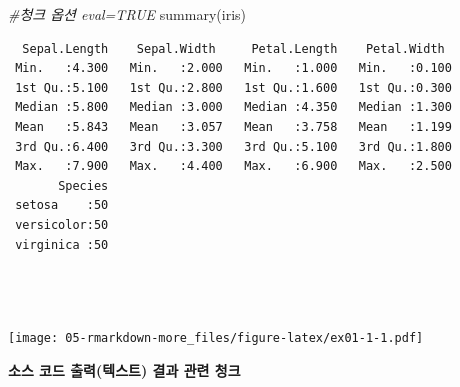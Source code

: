 \documentclass[
  11pt,
]{krantz}
\newenvironment{Shaded}{\begin{snugshade}}{\end{snugshade}}
\newcommand{\CommentTok}[1]{\textcolor[rgb]{0.37,0.37,0.37}{\textit{#1}}}
\newcommand{\FunctionTok}[1]{\textcolor[rgb]{0,0,0}{#1}}
\newcommand{\NormalTok}[1]{#1}
\newcommand{\SpecialCharTok}[1]{\textcolor[rgb]{0,0,0}{#1}}
\begin{document}
\footnotesize

\begin{Shaded}
\begin{Highlighting}[]
\CommentTok{\#청크 옵션 eval=TRUE}
\FunctionTok{summary}\NormalTok{(iris)}
\end{Highlighting}
\end{Shaded}

\begin{verbatim}
  Sepal.Length    Sepal.Width     Petal.Length    Petal.Width   
 Min.   :4.300   Min.   :2.000   Min.   :1.000   Min.   :0.100  
 1st Qu.:5.100   1st Qu.:2.800   1st Qu.:1.600   1st Qu.:0.300  
 Median :5.800   Median :3.000   Median :4.350   Median :1.300  
 Mean   :5.843   Mean   :3.057   Mean   :3.758   Mean   :1.199  
 3rd Qu.:6.400   3rd Qu.:3.300   3rd Qu.:5.100   3rd Qu.:1.800  
 Max.   :7.900   Max.   :4.400   Max.   :6.900   Max.   :2.500  
       Species  
 setosa    :50  
 versicolor:50  
 virginica :50  
                
                
                
\end{verbatim}

\begin{Shaded}
\end{Shaded}

\texttt{[image: 05-rmarkdown-more\_files/figure-latex/ex01-1-1.pdf]}

\normalsize

\footnotesize

\begin{Shaded}
\end{Shaded}

\normalsize

\textbf{소스 코드 출력(텍스트) 결과 관련 청크}

\footnotesize
\end{document}
